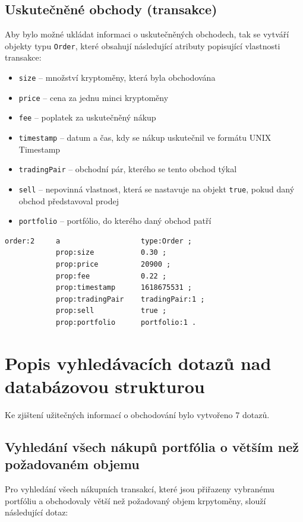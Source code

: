\documentclass[12pt, a4paper]{article}
\let\oldsection\section
\renewcommand\section{\clearpage\oldsection}
\begin{document}
\subsection{Uskutečněné obchody (transakce)}
Aby bylo možné ukládat informaci o uskutečněných obchodech, tak se vytváří objekty typu \texttt{Order}, které obsahují následující atributy popisující vlastnosti transakce: 
\begin{itemize}
    \item \texttt{size} -- množství kryptoměny, která byla obchodována
    \item \texttt{price} -- cena za jednu minci kryptoměny
    \item \texttt{fee} -- poplatek za uskutečněný nákup
    \item \texttt{timestamp} -- datum a čas, kdy se nákup uskutečnil ve formátu UNIX Timestamp
    \item \texttt{tradingPair} -- obchodní pár, kterého se tento obchod týkal
    \item \texttt{sell} -- nepovinná vlastnost, která se nastavuje na objekt \texttt{true}, pokud daný obchod představoval prodej
    \item \texttt{portfolio} -- portfólio, do kterého daný obchod patří
\end{itemize}

\begin{lstlisting}
order:2     a                   type:Order ;
            prop:size           0.30 ;
            prop:price          20900 ;
            prop:fee            0.22 ;
            prop:timestamp      1618675531 ;
            prop:tradingPair    tradingPair:1 ;
            prop:sell           true ;
            prop:portfolio      portfolio:1 .
\end{lstlisting}

\section{Popis vyhledávacích dotazů nad databázovou strukturou}
Ke zjištení užitečných informací o obchodování bylo vytvořeno 7 dotazů.

\subsection{Vyhledání všech nákupů portfólia o větším než požadovaném objemu  }
Pro vyhledání všech nákupních transakcí, které jsou přiřazeny vybranému portfóliu a obchodovaly větší než požadovaný objem krpytoměny, slouží následující dotaz:
\end{document}
